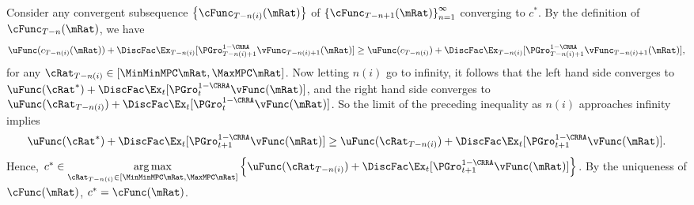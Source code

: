 \documentclass[\econtexRoot/BufferStockTheory]{subfiles}
\begin{document}
Consider any convergent subsequence $\left\{\cFunc_{T-n(i)}(\mRat)\right\}$ of $\left\{\cFunc_{T-n+1}(\mRat)\right\} _{n=1}^{\infty }$ converging to $c^*$. By the definition of $\cFunc_{T-n}(\mRat)$, we have 
\begin{equation}
    \uFunc(c_{T - n(i)}(\mRat)) + \DiscFac \Ex_{T - n(i)}[{\PGro}_{T-n(i)+1}^{1 - \CRRA}\vFunc_{T-n(i)+1}(\mRat)] \geq \uFunc(c_{T - n(i)}) + \DiscFac \Ex_{T - n(i)}[{\PGro}_{T-n(i)+1}^{1 - \CRRA}\vFunc_{T-n(i)+1}(\mRat)],
\end{equation}
for any $\cRat_{T - n(i)} \in [\MinMinMPC \mRat,\MaxMPC \mRat]$. Now letting $n(i)$ go to infinity, it follows that the left hand side converges to $\uFunc(\cRat^*) + \DiscFac \Ex_{t}[{\PGro}_{t}^{1 - \CRRA}\vFunc(\mRat)]$, and the right hand side converges to $\uFunc(\cRat_{T - n(i)}) + \DiscFac \Ex_{t}[{\PGro}_{t}^{1 - \CRRA}\vFunc(\mRat)]$. So the limit of the preceding inequality as $n(i)$ approaches infinity implies 
\begin{equation}
   \uFunc(\cRat^*) + \DiscFac \Ex_{t}[{\PGro}_{t + 1}^{1 - \CRRA}\vFunc(\mRat)] \geq \uFunc(\cRat_{T - n(i)}) + \DiscFac \Ex_{t}[{\PGro}_{t + 1}^{1 - \CRRA}\vFunc(\mRat)].
\end{equation}
Hence, $c^* \in \underset{\cRat_{T - n(i)} \in [\MinMinMPC \mRat,\MaxMPC \mRat]}{\arg \max }\left\{ \uFunc(\cRat_{T - n(i)}) + \DiscFac \Ex_{t}[{\PGro}_{t + 1}^{1 - \CRRA}\vFunc(\mRat)]\right\}$. By the uniqueness of $\cFunc(\mRat)$, $c^* = \cFunc(\mRat)$.
\end{document}
